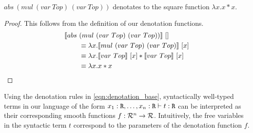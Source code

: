 



  \begin{example}[Square]
    $abs\ (mul\ (var\ Top)\ (var\ Top))$ denotates to the square function $\lambda x. x * x$.
    \begin{proof}
      This follows from the definition of our denotation functions.
      \begin{align*}
        \llbracket abs\ &(mul\ (var\ Top)\ (var\ Top)) \rrbracket\ [] \\
          &\equiv \lambda x.
            \llbracket mul\ (var\ Top)\ (var\ Top) \rrbracket\ [x] \\
          &\equiv \lambda x.
            \llbracket var\ Top \rrbracket\ [x] *
              \llbracket var\ Top \rrbracket\ [x] \\
          &\equiv \lambda x. x * x \qedhere
      \end{align*}
    \end{proof}
  \end{example}


  Using the denotation rules in \cref{eqn:denotation_base}, syntactically well-typed terms in our language of the form $x_1 : \texttt{R}, \dots, x_n : \texttt{R} \vdash t : \texttt{R}$ can be interpreted as their corresponding smooth functions $f : \mathcal{R}^n \to \mathcal{R}$.
  Intuitively, the free variables in the syntactic term $t$ correspond to the parameters of the denotation function $f$.


